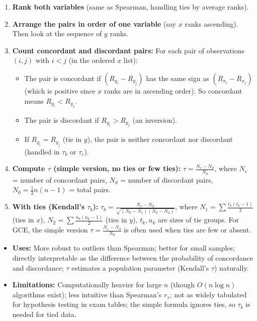 \documentclass[11pt]{article}
\newcommand{\cle}[1]{{\popxbold\color{popdark}#1}}
\begin{document}
\begin{methode}
\begin{enumerate}
\item \textbf{Rank both variables} (same as Spearman, handling ties by average ranks).
\item \textbf{Arrange the pairs in order of one variable} (say $x$ ranks ascending). Then look at the sequence of $y$ ranks.
\item \textbf{Count concordant and discordant pairs:} For each pair of observations $(i,j)$ with $i < j$ (in the ordered $x$ list):
\begin{itemize}
\item The pair is \cle{concordant} if $(R_{y_i} - R_{y_j})$ has the same sign as $(R_{x_i} - R_{x_j})$ (which is positive since $x$ ranks are in ascending order). So concordant means $R_{y_i} < R_{y_j}$.
\item The pair is \cle{discordant} if $R_{y_i} > R_{y_j}$ (an inversion).
\item If $R_{y_i} = R_{y_j}$ (tie in $y$), the pair is neither concordant nor discordant (handled in $\tau_b$ or $\tau_c$).
\end{itemize}
\item \textbf{Compute $\tau$ (simple version, no ties or few ties):}
$\tau = \frac{N_c - N_d}{N_0}$, where $N_c$ = number of concordant pairs, $N_d$ = number of discordant pairs, $N_0 = \frac{1}{2}n(n-1)$ = total pairs.
\item \textbf{With ties (Kendall's $\tau_b$):}
$\tau_b = \frac{N_c - N_d}{\sqrt{(N_0 - N_1)(N_0 - N_2)}}$,
where $N_1 = \sum \frac{t_k(t_k-1)}{2}$ (ties in $x$), $N_2 = \sum \frac{u_k(u_k-1)}{2}$ (ties in $y$), $t_k, u_k$ are sizes of tie groups.
For GCE, the simple version $\tau = \frac{N_c - N_d}{N_0}$ is often used when ties are few or absent.
\end{enumerate}
\end{methode}

\begin{aretenir}
\begin{itemize}
\item \textbf{Uses:} More robust to outliers than Spearman; better for small samples; directly interpretable as the difference between the probability of concordance and discordance; $\tau$ estimates a population parameter (Kendall's $\tau$) naturally.
\item \textbf{Limitations:} Computationally heavier for large $n$ (though $O(n \log n)$ algorithms exist); less intuitive than Spearman's $r_s$; not as widely tabulated for hypothesis testing in exam tables; the simple formula ignores ties, so $\tau_b$ is needed for tied data.
\end{itemize}
\end{aretenir}
\end{document}
